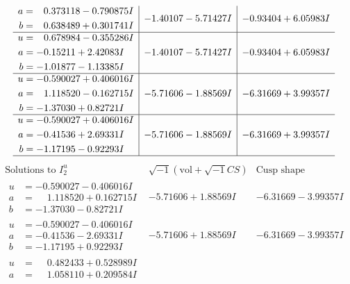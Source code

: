 \documentclass[1p]{elsarticle_modified}
\theoremstyle{definition}
\newcommand{\I}{\sqrt{-1}}
\begin{document}
$$\begin{array}{c|c|c}
\begin{aligned}
a &= \phantom{-}0.373118 - 0.790875 I \\
b &= \phantom{-}0.638489 + 0.301741 I\end{aligned}
 & -1.40107 - 5.71427 I & -0.93404 + 6.05983 I \\ \hline\begin{aligned}
u &= \phantom{-}0.678984 - 0.355286 I \\
a &= -0.15211 + 2.42083 I \\
b &= -1.01877 - 1.13385 I\end{aligned}
 & -1.40107 - 5.71427 I & -0.93404 + 6.05983 I \\ \hline\begin{aligned}
u &= -0.590027 + 0.406016 I \\
a &= \phantom{-}1.118520 - 0.162715 I \\
b &= -1.37030 + 0.82721 I\end{aligned}
 & -5.71606 - 1.88569 I & -6.31669 + 3.99357 I \\ \hline\begin{aligned}
u &= -0.590027 + 0.406016 I \\
a &= -0.41536 + 2.69331 I \\
b &= -1.17195 - 0.92293 I\end{aligned}
 & -5.71606 - 1.88569 I & -6.31669 + 3.99357 I\\
 \hline 
 \end{array}$$\newpage$$\begin{array}{c|c|c}  
\text{Solutions to }I^u_{2}& \I (\text{vol} + \sqrt{-1}CS) & \text{Cusp shape}\\
 \hline 
\begin{aligned}
u &= -0.590027 - 0.406016 I \\
a &= \phantom{-}1.118520 + 0.162715 I \\
b &= -1.37030 - 0.82721 I\end{aligned}
 & -5.71606 + 1.88569 I & -6.31669 - 3.99357 I \\ \hline\begin{aligned}
u &= -0.590027 - 0.406016 I \\
a &= -0.41536 - 2.69331 I \\
b &= -1.17195 + 0.92293 I\end{aligned}
 & -5.71606 + 1.88569 I & -6.31669 - 3.99357 I \\ \hline\begin{aligned}
u &= \phantom{-}0.482433 + 0.528989 I \\
a &= \phantom{-}1.058110 + 0.209584 I \\

\end{aligned}
\end{array}$$
\end{document}
